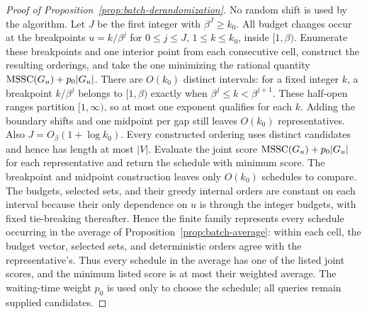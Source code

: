 \begin{proof}[Proof of Proposition~\ref{prop:batch-derandomization}]
No random shift is used by the algorithm. Let $J$ be the first
integer with $\beta^J\ge k_0$. All budget changes occur at the
breakpoints $u=k/\beta^j$ for
$0\le j\le J$, $1\le k\le k_0$, inside $[1,\beta)$.
Enumerate these breakpoints and one interior point from each
consecutive cell, construct the resulting orderings, and
take the one minimizing the rational quantity
$\operatorname{MSSC}(G_u)+p_0|G_u|$. There are
$O(k_0)$ distinct intervals: for a fixed integer $k$, a breakpoint
$k/\beta^j$ belongs to $[1,\beta)$ exactly when
$\beta^j\le k<\beta^{j+1}$. These half-open ranges partition
$[1,\infty)$, so at most one exponent qualifies for each $k$.
Adding the boundary shifts and one midpoint per gap still leaves
$O(k_0)$ representatives.
Also $J=O_\beta(1+\log k_0)$. Every constructed ordering
uses distinct candidates and hence has length at most $|V|$.
Evaluate the joint score $\operatorname{MSSC}(G_u)+p_0|G_u|$ for each representative
and return the schedule with minimum score. The breakpoint and midpoint
construction leaves only $O(k_0)$ schedules to compare.
The budgets, selected sets, and their greedy internal orders are
constant on each interval because their only dependence on $u$
is through the integer budgets, with fixed tie-breaking thereafter.
Hence the finite family represents every schedule occurring in
the average of Proposition~\ref{prop:batch-average}: within each cell,
the budget vector, selected sets, and deterministic orders agree with
the representative's. Thus every schedule in the average has one of
the listed joint scores, and the minimum listed score is at most their
weighted average. The waiting-time weight $p_0$ is used
only to choose the schedule; all queries remain supplied candidates.
\end{proof}

